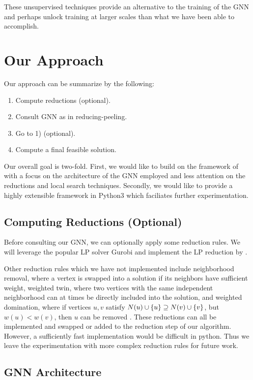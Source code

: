 \documentclass{article}
\DeclarePairedDelimiter{\set}{\lbrace}{\rbrace}
\begin{document}
These unsupervised techniques provide an alternative to the training of the GNN
and perhaps unlock training at larger scales than what we have been able to accomplish.

\section{Our Approach}
Our approach can be summarize by the following:
\begin{enumerate}[1)]
  \item Compute reductions (optional).
  \item Consult GNN as in reducing-peeling.
  \item Go to 1) (optional).
  \item Compute a final feasible solution.
\end{enumerate}
Our overall goal is two-fold.
First, we would like to build on the framework of \citet{langedal_et_al}
with a focus on the architecture of the GNN employed
and less attention on the reductions and local search techniques.
Secondly, we would like to provide a highly extensible framework in Python3
which faciliates further experimentation.

\subsection{Computing Reductions (Optional)}
Before consulting our GNN,
we can optionally apply some reduction rules.
We will leverage the popular LP solver Gurobi \citet{gurobi}
and implement the LP reduction by \citet{lpreduction}.

Other reduction rules which we have not implemented include
neighborhood removal,
where a vertex is swapped into a solution if its neighbors have sufficient weight,
weighted twin,
where two vertices with the same independent neighborhood can at times be directly included into the solution,
and weighted domination,
where if vertices $u, v$ satisfy $N(u)\cup \set{u} \supseteq N(v)\cup \set{v}$,
but $w(u) < w(v)$,
then $u$ can be removed \citet{kamis}.
These reductions can all be implemented and swapped or added to the reduction step of our algorithm.
However,
a sufficiently fast implementation would be difficult in python.
Thus we leave the experimentation with more complex reduction rules for future work.

\subsection{GNN Architecture}
\end{document}
